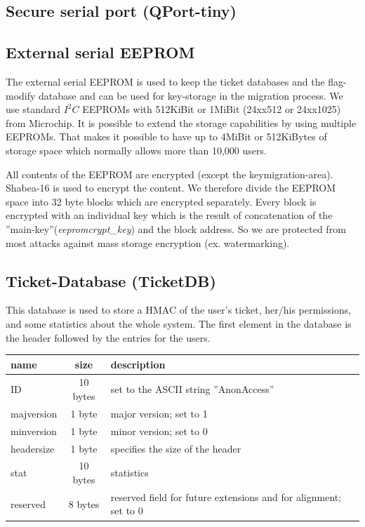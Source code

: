
\subsection{Secure serial port (QPort-tiny)}


\subsection{External serial EEPROM}
The external serial EEPROM is used to keep the ticket databases and the flag-modify database and can be used for key-storage in the migration process. We use standard $I^2C$\cite{I2C} EEPROMs with 512KiBit or 1MiBit (24xx512\cite{24xx512} or 24xx1025\cite{24xx1025}) from Microchip\cite{microchip}. It is possible to extend the storage capabilities by using multiple EEPROMs. That makes it possible to have up to 4MiBit or 512KiBytes of storage space which normally allows more than 10,000 users.

All contents of the EEPROM are encrypted (except the keymigration-area). Shabea-16 is used to encrypt the content. We therefore divide the EEPROM space into 32 byte blocks which are encrypted separately. Every block is encrypted with an individual key which is the result of concatenation of the ''main-key''(\textit{eepromcrypt\_key}) and the block address. So we are protected from most attacks against mass storage encryption (ex. watermarking).


\subsection{Ticket-Database (TicketDB)}
This database is used to store a HMAC of the user's ticket, her/his permissions, and some statistics about the whole system.
The first element in the database is the header followed by the entries for the users.\\
\begin{tabular}{|l|c|l|}\hline 
name & size & description \\ \hline
ID & 10 bytes & set to the ASCII string ''AnonAccess'' \\
majversion & 1 byte & major version; set to 1 \\
minversion & 1 byte & minor version; set to 0 \\
headersize & 1 byte & specifies the size of the header \\
stat & 10 bytes & statistics \\
reserved & 8 bytes & reserved field for future extensions and for alignment; set to 0 \\ \hline
\end{tabular} 

